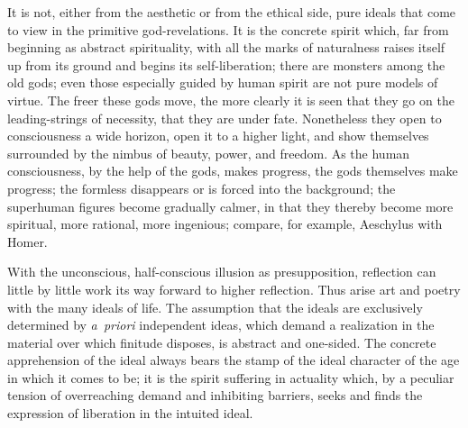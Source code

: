 \documentclass[12pt]{book}
\begin{document}
It is not, either from the aesthetic or from the ethical side, pure ideals that come to view in
the primitive god-revelations. It is the concrete spirit which, far from beginning as abstract
spirituality, with all the marks of naturalness raises itself up from its ground and begins its
self-liberation; there are monsters among the old gods; even those especially guided by human
spirit are not pure models of virtue. The freer these gods move, the more clearly it is seen
that they go on the leading-strings of necessity, that they are under fate. Nonetheless they
open to consciousness a wide horizon, open it to a higher light, and show themselves surrounded
by the nimbus of beauty, power, and freedom. As the human consciousness, by the help of the
gods, makes progress, the gods themselves make progress; the formless disappears or is forced
into the background; the superhuman figures become gradually calmer, in that they thereby become
more spiritual, more rational, more ingenious; compare, for example, Aeschylus with Homer.

With the unconscious, half-conscious illusion as presupposition, reflection can little by little
work its way forward to higher reflection. Thus arise art and poetry with the many ideals of
life. The assumption that the ideals are exclusively determined by \textit{a~priori} independent
ideas, which demand a realization in the material over which finitude disposes, is abstract and
one-sided. The concrete apprehension of the ideal always bears the stamp of the ideal character
of the age in which it comes to be; it is the spirit suffering in actuality which, by a peculiar
tension of overreaching demand and inhibiting barriers, seeks and finds the expression of
liberation in the intuited ideal.
\end{document}
